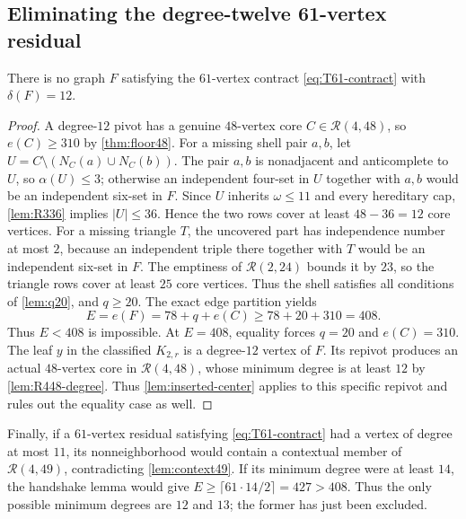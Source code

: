 \subsection{Eliminating the degree-twelve 61-vertex residual}

\begin{proposition}
\label{prop:h12-empty}
There is no graph $F$ satisfying the $61$-vertex contract \eqref{eq:T61-contract} with $\delta(F)=12$.
\end{proposition}

\begin{proof}
A degree-$12$ pivot has a genuine $48$-vertex core $C\in\mathcal R(4,48)$, so $e(C)\geq310$ by \cref{thm:floor48}. For a missing shell pair $a,b$, let $U=C\setminus(N_C(a)\cup N_C(b))$. The pair $a,b$ is nonadjacent and anticomplete to $U$, so $\alpha(U)\leq3$; otherwise an independent four-set in $U$ together with $a,b$ would be an independent six-set in $F$. Since $U$ inherits $\omega\leq11$ and every hereditary cap, \cref{lem:R336} implies $|U|\leq36$. Hence the two rows cover at least $48-36=12$ core vertices. For a missing triangle $T$, the uncovered part has independence number at most $2$, because an independent triple there together with $T$ would be an independent six-set in $F$. The emptiness of $\mathcal R(2,24)$ bounds it by $23$, so the triangle rows cover at least $25$ core vertices. Thus the shell satisfies all conditions of \cref{lem:q20}, and $q\geq20$. The exact edge partition yields
\[
E=e(F)=78+q+e(C)\geq78+20+310=408.
\]
Thus $E<408$ is impossible. At $E=408$, equality forces $q=20$ and $e(C)=310$. The leaf $y$ in the classified $K_{2,r}$ is a degree-$12$ vertex of $F$. Its repivot produces an actual $48$-vertex core in $\mathcal R(4,48)$, whose minimum degree is at least $12$ by \cref{lem:R448-degree}. Thus \cref{lem:inserted-center} applies to this specific repivot and rules out the equality case as well.
\end{proof}

Finally, if a $61$-vertex residual satisfying \eqref{eq:T61-contract} had a vertex of degree at most $11$, its nonneighborhood would contain a contextual member of $\mathcal R(4,49)$, contradicting \cref{lem:context49}. If its minimum degree were at least $14$, the handshake lemma would give $E\geq\lceil61\cdot14/2\rceil=427>408$. Thus the only possible minimum degrees are $12$ and $13$; the former has just been excluded.

